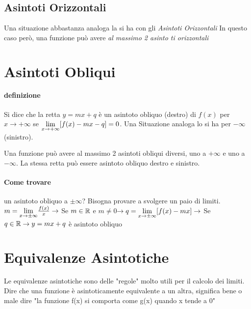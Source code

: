 \documentclass[12pt, a4paper, openany]{book}
\begin{document}
\subsection*{Asintoti Orizzontali}
Una situazione abbastanza analoga la si ha con gli \emph{Asintoti Orizzontali}
In questo caso però, una funzione può avere \emph{al massimo 2 asinto   ti orizzontali}

\section{Asintoti Obliqui}
\paragraph*{definizione}{ %
	Si dice che la retta $y=mx + q$ è un asintoto obliquo (destro) di $f(x)$ per $x \to +\infty$ se
	$\underset{x \to +\infty}{\lim} [f(x)-mx-q]=0$.
	Una Situazione analoga lo si ha per $-\infty $ (sinistro).
}

Una funzione può avere al massimo 2 asintoti obliqui diversi, uno a $+\infty$ e uno a $-\infty$.
La stessa retta può essere asintoto obliquo destro e sinistro.
\paragraph*{Come trovare} un asintoto obliquo a $\pm \infty$? %
Bisogna provare a svolgere un paio di limiti.
\\$m= \underset{x \to \pm \infty}{\lim} \frac{f(x)}{x} \rightarrow$ Se $m\in\mathbb{R}$ e $m\neq 0$$ \rightarrow q=\underset{x \to \pm \infty}{\lim} [f(x)-mx] \rightarrow$ Se $q\in\mathbb{R} \rightarrow y=mx+q$ è asintoto obliquo

	\section{Equivalenze Asintotiche}
	Le equivalenze asintotiche sono delle "regole" molto utili per il calcolo dei limiti.
	Dire che una funzione è asintoticamente equivalente a un altra, significa bene o male dire "la funzione f(x) si comporta come g(x) quando x tende a 0"
\end{document}
